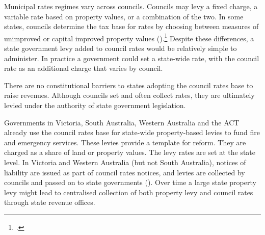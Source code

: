 \documentclass[twoside,english]{palatinob5portrait}
\begin{document}
Municipal rates regimes vary across councils. Councils may levy a fixed charge, a variable rate based on property values, or a combination of the two. In some states, councils determine the tax base for rates by choosing between measures of unimproved or capital improved property values ().\footcite[][198]{productivity2008assessing}  Despite these differences, a state government levy added to council rates would be relatively simple to administer. In practice a government could set a state-wide rate, with the council rate as an additional charge that varies by council.

There are no constitutional barriers to states adopting the council rates base to raise revenues. Although councils set and often collect rates, they are ultimately levied under the authority of state government legislation. 


Governments in Victoria, South Australia, Western Australia and the ACT already use the council rates base for state-wide property-based levies to fund fire and emergency services. These levies provide a template for reform. They are charged as a share of land or property values. The levy rates are set at the state level. In Victoria and Western Australia (but not South Australia), notices of liability are issued as part of council rates notices, and levies are collected by councils and passed on to state governments (). Over time a large state property levy might lead to centralised collection of both property levy and council rates through state revenue offices.
\end{document}
